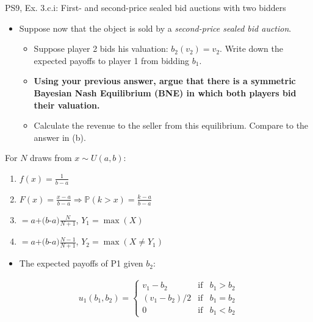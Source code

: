 \begin{frame}{PS9, Ex. 3.c.i: First- and second-price sealed bid auctions with two bidders}
    \begin{multicols}{2}
      \begin{itemize}
        \item[(c)] Suppose now that the object is sold by a \textit{second-price sealed bid auction}.
        \begin{itemize}\normalsize
          \item[i.]   Suppose player 2 bids his valuation: $b_2(v_2) = v_2$. Write down the expected payoffs to player 1 from bidding $b_1$.
          \item[ii.]  \textbf{Using your previous answer, argue that there is a symmetric Bayesian Nash Equilibrium (BNE) in which both players bid their valuation.}
          \item[iii.] Calculate the revenue to the seller from this equilibrium. Compare to the answer in (b).
        \end{itemize}
      \end{itemize}
      For $N$ draws from $x\sim U(a, b):$
      \vspace{-6pt}
      \begin{enumerate}
        \item[PDF:] $f(x)=\frac{1}{b-a}$
        \item[CDF:] $F(x)=\frac{x-a}{b-a}\Rightarrow\mathbb{P}(k>x)=\frac{k-a}{b-a}$
        \item[$\mathbb{E}(Y_1)$] $=a$+$(b$-$a)\frac{N}{N+1}$, $Y_1=\max(X)$
        \item[$\mathbb{E}(Y_2)$] $=a$+$(b$-$a)\frac{N-1}{N+1}$, $Y_2=\max(X\neq Y_1)$
      \end{enumerate}
      \vfill\null\columnbreak
      \begin{itemize}
        \item[(i)] The expected payoffs of P1 given $b_2$:
      \end{itemize}
      \vspace{-12pt}
      \begin{align*}
        u_1(b_1,b_2)=\left\{\begin{array}{lcl}
          v_1-b_2     & \text{if} & b_1>b_2 \\
          (v_1-b_2)/2 & \text{if} & b_1=b_2 \\
          0           & \text{if} & b_1<b_2
        \end{array}\right.
      \end{align*}
      \vfill\null
    \end{multicols}
\end{frame}



